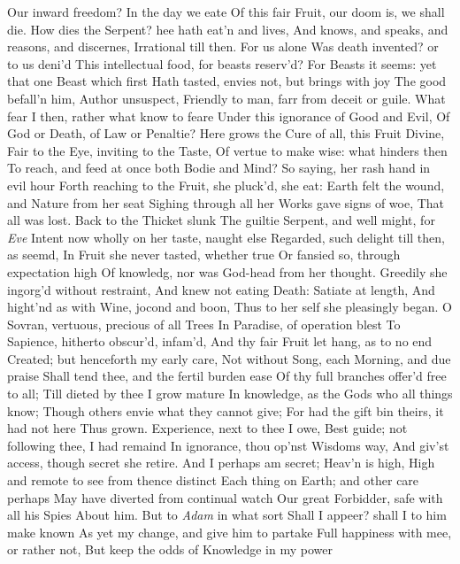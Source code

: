 \documentclass[11pt]{book}
\newcounter {first}
\begin{document}
Our inward freedom?  In the day we eate 
Of this fair Fruit, our doom is, we shall die. 
How dies the Serpent? hee hath eat'n and lives, 
And knows, and speaks, and reasons, and discernes, 
Irrational till then.  For us alone 
Was death invented? or to us deni'd 
This intellectual food, for beasts reserv'd? 
For Beasts it seems: yet that one Beast which first 
Hath tasted, envies not, but brings with joy 
The good befall'n him, Author unsuspect, 
Friendly to man, farr from deceit or guile. 
What fear I then, rather what know to feare 
Under this ignorance of Good and Evil, 
Of God or Death, of Law or Penaltie? 
Here grows the Cure of all, this Fruit Divine, 
Fair to the Eye, inviting to the Taste, 
Of vertue to make wise: what hinders then 
To reach, and feed at once both Bodie and Mind? 
\quad So saying, her rash hand in evil hour 
Forth reaching to the Fruit, she pluck'd, she eat: 
Earth felt the wound, and Nature from her seat 
Sighing through all her Works gave signs of woe, 
That all was lost.  Back to the Thicket slunk 
The guiltie Serpent, and well might, for \textit{Eve} 
Intent now wholly on her taste, naught else 
Regarded, such delight till then, as seemd, 
In Fruit she never tasted, whether true 
Or fansied so, through expectation high 
Of knowledg, nor was God-head from her thought. 
Greedily she ingorg'd without restraint, 
And knew not eating Death: Satiate at length, 
And hight'nd as with Wine, jocond and boon, 
Thus to her self she pleasingly began. 
\quad O Sovran, vertuous, precious of all Trees 
In Paradise, of operation blest 
To Sapience, hitherto obscur'd, infam'd, 
And thy fair Fruit let hang, as to no end 
Created; but henceforth my early care, 
Not without Song, each Morning, and due praise 
Shall tend thee, and the fertil burden ease 
Of thy full branches offer'd free to all; 
Till dieted by thee I grow mature 
In knowledge, as the Gods who all things know; 
Though others envie what they cannot give; 
For had the gift bin theirs, it had not here 
Thus grown.  Experience, next to thee I owe, 
Best guide; not following thee, I had remaind 
In ignorance, thou op'nst Wisdoms way, 
And giv'st access, though secret she retire. 
And I perhaps am secret; Heav'n is high, 
High and remote to see from thence distinct 
Each thing on Earth; and other care perhaps 
May have diverted from continual watch 
Our great Forbidder, safe with all his Spies 
About him.  But to \textit{Adam} in what sort 
Shall I appeer? shall I to him make known 
As yet my change, and give him to partake 
Full happiness with mee, or rather not, 
But keep the odds of Knowledge in my power 
\end{document}
